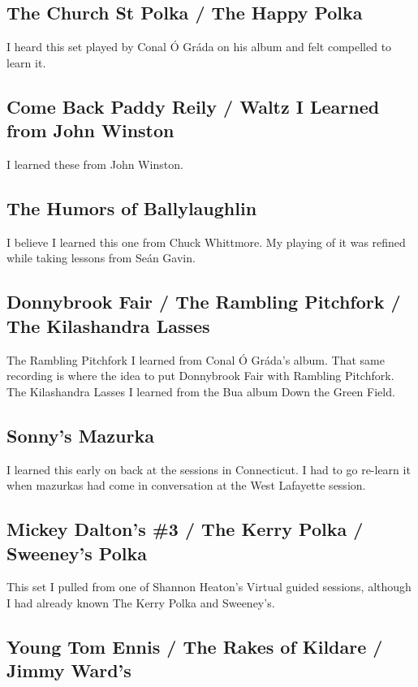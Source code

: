 \documentclass[11pt,letterpaper]{article}
\begin{document}
\subsection{The Church St Polka / The Happy Polka}

I heard this set played by Conal \'O Gr\'ada on his album and felt compelled to learn it. 

\subsection{Come Back Paddy Reily / Waltz I Learned from John Winston}

I learned these from John Winston.

\subsection{The Humors of Ballylaughlin}

I believe I learned this one from Chuck Whittmore. My playing of it was refined while taking lessons from Se\'an Gavin.

\subsection{Donnybrook Fair / The Rambling Pitchfork / The Kilashandra Lasses}

The Rambling Pitchfork I learned from Conal \'O Gr\'ada's album. That same recording is where the idea to put Donnybrook Fair with Rambling Pitchfork. The Kilashandra Lasses I learned from the Bua album Down the Green Field.

\subsection{Sonny's Mazurka}

I learned this early on back at the sessions in Connecticut. I had to go re-learn it when mazurkas had come in conversation at the West Lafayette session.

\subsection{Mickey Dalton's \#3 / The Kerry Polka / Sweeney's Polka}

This set I pulled from one of Shannon Heaton's Virtual guided sessions, although I had already known The Kerry Polka and Sweeney's. 

\subsection{Young Tom Ennis / The Rakes of Kildare / Jimmy Ward's}
\end{document}
